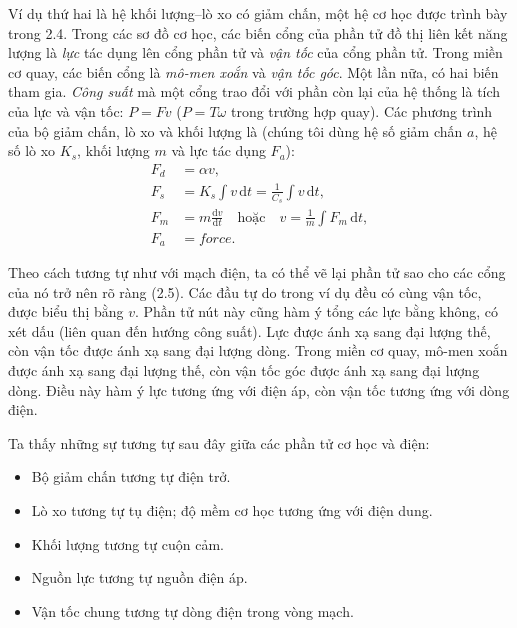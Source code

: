Ví dụ thứ hai là hệ khối lượng--lò xo có giảm chấn, một hệ cơ học được trình bày trong 2.4. Trong các sơ đồ cơ học, các biến cổng của phần tử đồ thị liên kết năng lượng là \emph{lực} tác dụng lên cổng phần tử và \emph{vận tốc} của cổng phần tử. Trong miền cơ quay, các biến cổng là \emph{mô-men xoắn} và \emph{vận tốc góc}. Một lần nữa, có hai biến tham gia. \emph{Công suất} mà một cổng trao đổi với phần còn lại của hệ thống là tích của lực và vận tốc: $P=Fv$ ($P=T\omega$ trong trường hợp quay). Các phương trình của bộ giảm chấn, lò xo và khối lượng là (chúng tôi dùng hệ số giảm chấn $a$, hệ số lò xo $K_s$, khối lượng $m$ và lực tác dụng $F_a$):
\[
\begin{aligned}
F_d &= \alpha v,\\
F_s &= K_s\int v\,\mathrm{d}t = \frac{1}{C_s}\int v\,\mathrm{d}t,\\
F_m &= m\frac{\mathrm{d}v}{\mathrm{d}t}\quad\text{hoặc}\quad
v = \frac{1}{m}\int F_m\,\mathrm{d}t,\\
F_a &= \mathit{force}.
\end{aligned}
\]

Theo cách tương tự như với mạch điện, ta có thể vẽ lại phần tử sao cho các cổng của nó trở nên rõ ràng (2.5). Các đầu tự do trong ví dụ đều có cùng vận tốc, được biểu thị bằng $v$. Phần tử nút này cũng hàm ý tổng các lực bằng không, có xét dấu (liên quan đến hướng công suất). Lực được ánh xạ sang đại lượng thế, còn vận tốc được ánh xạ sang đại lượng dòng. Trong miền cơ quay, mô-men xoắn được ánh xạ sang đại lượng thế, còn vận tốc góc được ánh xạ sang đại lượng dòng. Điều này hàm ý lực tương ứng với điện áp, còn vận tốc tương ứng với dòng điện.

Ta thấy những sự tương tự sau đây giữa các phần tử cơ học và điện:
\begin{itemize}
\item Bộ giảm chấn tương tự điện trở.
\item Lò xo tương tự tụ điện; độ mềm cơ học tương ứng với điện dung.
\item Khối lượng tương tự cuộn cảm.
\item Nguồn lực tương tự nguồn điện áp.
\item Vận tốc chung tương tự dòng điện trong vòng mạch.
\end{itemize}

